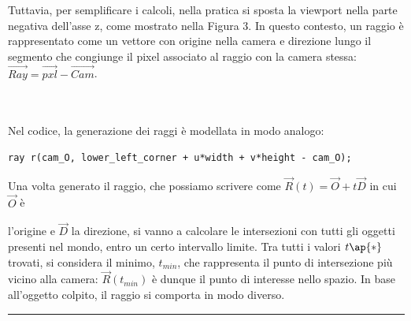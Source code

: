 \documentclass[main.tex]{subfiles}
\begin{document}
\begin{minipage}{0.6\textwidth}
Tuttavia, per semplificare i calcoli, nella pratica si sposta la viewport nella parte negativa dell'asse z, come mostrato nella Figura 3. In questo contesto, un raggio è rappresentato come un vettore con origine nella camera e direzione lungo il segmento che congiunge il pixel associato al raggio con la camera stessa: \(\Vec{Ray} = \Vec{pxl} - \Vec{Cam}\).
\end{minipage}\\\\
Nel codice, la generazione dei raggi è modellata in modo analogo:
\begin{lstlisting}[style=cppstyle, label=cppexample]
ray r(cam_O, lower_left_corner + u*width + v*height - cam_O);
\end{lstlisting}
Una volta generato il raggio, che possiamo scrivere come \(\Vec{R}(t) = \Vec{O} + t\Vec{D}\) in cui \(\Vec{O}\) è \\ 
\begin{minipage}{0.6\textwidth}
 l'origine e \(\Vec{D}\) la direzione, si vanno a calcolare le intersezioni con tutti gli oggetti presenti nel mondo, entro un certo intervallo limite.
Tra tutti i valori \(t\ap{*}\) trovati, si considera il minimo, \(t_{min}\), che rappresenta il punto di intersezione più vicino alla camera: \(\Vec{R}(t_{min})\) è dunque il punto di interesse nello spazio. In base all'oggetto colpito, il raggio si comporta in modo diverso.
\end{minipage}%
\begin{minipage}{0.4\textwidth}
    \centering
    \captionsetup{aboveskip=0pt}
    \vspace{-14pt}\rule{0.7\linewidth}{0.4pt}
\end{minipage}\\
\end{document}
